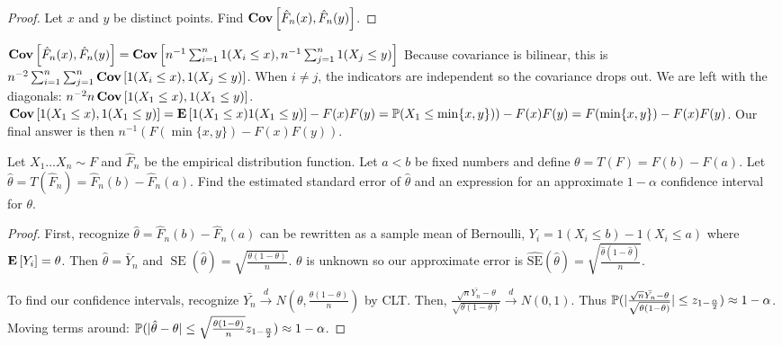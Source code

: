 \documentclass[10pt]{article}
\begin{document}
\begin{proof}
    Let $x$ and $y$ be distinct points. Find $\Cov{\hat{F}_n(x), \hat{F}_n(y)}$.
\end{proof}

\begin{exercise}
    $\Cov{\hat{F}_n(x), \hat{F}_n(y)} = \Cov{n^{-1}\sum_{i=1}^n 1(X_i \leq x),
    n^{-1}\sum_{j=1}^n 1(X_j \leq y)}$ Because covariance is bilinear, this is
    $n^{-2}\sum_{i=1}^n\sum_{j=1}^n\Cov{1(X_i \leq x), 1(X_j \leq y)}$. When $i
    \neq j$, the indicators are independent so the covariance drops out. We are
    left with the diagonals: $n^{-2}n\Cov{1(X_1\leq x), 1(X_1\leq y)}$.
    $\Cov{1(X_1\leq x), 1(X_1\leq y)} = \E{1(X_1\leq x)1(X_1\leq y)} - F(x)F(y)
    = \P(X_1 \leq \min\{x,y\})) - F(x)F(y) = F(\min\{x, y\})-F(x)F(y)$. Our final
    answer is then $n^{-1}(F(\min\{x, y\})-F(x)F(y))$.
\end{exercise}

\begin{exercise}
    Let $X_1 \dots X_n \sim F$ and $\hat{F}_n$ be the empirical distribution
    function. Let $a < b$ be fixed numbers and define $\theta = T(F) = F(b) -
    F(a)$. Let $\hat{\theta} = T(\hat{F}_n) = \hat{F}_n(b) - \hat{F}_n(a)$.
    Find the estimated standard error of $\hat{\theta}$ and an expression for
    an approximate $1-\alpha$ confidence interval for $\theta$.
\end{exercise}

\begin{proof}
    First, recognize $\hat{\theta} = \hat{F}_n(b) - \hat{F}_n(a)$ can be
    rewritten as a sample mean of Bernoulli, $Y_i = 1(X_i \leq b) - 1(X_i \leq
    a)$ where $\E{Y_i} = \theta$. Then $\hat{\theta} = \bar{Y}_n$ and
    $\operatorname{SE}{(\hat{\theta})} = \sqrt{\frac{\theta(1-\theta)}{n}}$.
    $\theta$ is unknown so our approximate error is
    $\operatorname{\hat{SE}}{(\hat{\theta})} =
    \sqrt{\frac{\hat{\theta}(1-\hat{\theta})}{n}}$.

    To find our confidence intervals, recognize $\bar{Y_n} \xrightarrow{d}
    N(\theta, \frac{\theta(1-\theta)}{n})$ by CLT. Then,
    $\frac{\sqrt{n}\bar{Y_n}-\theta}{\sqrt{\theta(1-\theta)}} \xrightarrow{d} N(0,
    1)$. Thus $\P(|\frac{\sqrt{n}\bar{Y_n}-\theta}{\sqrt{\theta(1-\theta)}}|
    \leq z_{1-\frac{\alpha}{2}}) \approx 1-\alpha$. Moving terms
    around: 
    $\P(|\hat{\theta}-\theta| \leq
    \sqrt{\frac{\theta(1-\theta)}{n}}z_{1-\frac{\alpha}{2}}) \approx
    1-\alpha$.
\end{proof}
\end{document}
